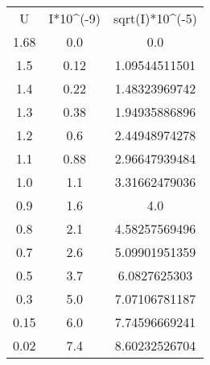 \begin{table}
\begin{tabular}{ccc}
U & I*10^(-9) & sqrt(I)*10^(-5) \\
1.68 & 0.0 & 0.0 \\
1.5 & 0.12 & 1.09544511501 \\
1.4 & 0.22 & 1.48323969742 \\
1.3 & 0.38 & 1.94935886896 \\
1.2 & 0.6 & 2.44948974278 \\
1.1 & 0.88 & 2.96647939484 \\
1.0 & 1.1 & 3.31662479036 \\
0.9 & 1.6 & 4.0 \\
0.8 & 2.1 & 4.58257569496 \\
0.7 & 2.6 & 5.09901951359 \\
0.5 & 3.7 & 6.0827625303 \\
0.3 & 5.0 & 7.07106781187 \\
0.15 & 6.0 & 7.74596669241 \\
0.02 & 7.4 & 8.60232526704 \\
\end{tabular}
\end{table}
